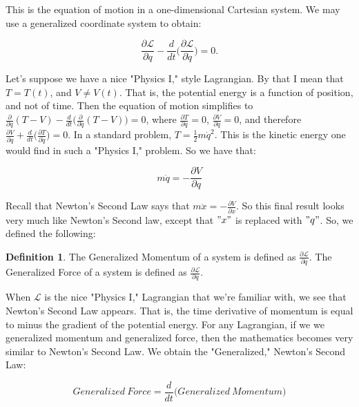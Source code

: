 \documentclass[oneside]{book}
\theoremstyle{definition}
\newtheorem{definition}{Definition}[section]
\begin{document}
This is the equation of motion in a one-dimensional Cartesian system. We may use a generalized coordinate system to obtain:

\begin{equation}
\nonumber \frac{\partial \mathcal{L}}{\partial q} - \frac{d}{dt} \big(\frac{\partial \mathcal{L}}{\partial \dot{q}}\big) = 0.
\end{equation}

Let's suppose we have a nice "Physics I," style Lagrangian. By that I mean that $T = T(t)$, and $V \ne V(t)$. That is, the potential energy is a function of position, and not of time. Then the equation of motion simplifies to $\frac{\partial}{\partial q}(T-V) - \frac{d}{dt}\big(\frac{\partial}{\partial \dot{q}}(T-V)\big) = 0$, where $\frac{\partial T}{\partial q} = 0$, $\frac{\partial V}{\partial \dot{q}} = 0$, and therefore $\frac{\partial V}{\partial q} + \frac{d}{dt}\big(\frac{\partial T}{\partial \dot{q}}\big) = 0$. In a standard problem, $T = \frac{1}{2}m \dot{q}^2$. This is the kinetic energy one would find in such a "Physics I," problem. So we have that:

\begin{equation}
\nonumber m\ddot{q} = -\frac{\partial V}{\partial q}
\end{equation}

Recall that Newton's Second Law says that $m\ddot{x} = -\frac{\partial V}{\partial x}$. So this final result looks very much like Newton's Second law, except that $"x"$ is replaced with $"q"$. So, we defined the following:

\begin{definition}
The Generalized Momentum of a system is defined as $\frac{\partial \mathcal{L}}{\partial \dot{q}}$. The Generalized Force of a system is defined as $\frac{\partial \mathcal{L}}{\partial q}$.
\end{definition}

When $\mathcal{L}$ is the nice "Physics I," Lagrangian that we're familiar with, we see that Newton's Second Law appears. That is, the time derivative of momentum is equal to minus the gradient of the potential energy. For any Lagrangian, if we we generalized momentum and generalized force, then the mathematics becomes very similar to Newton's Second Law. We obtain the "Generalized," Newton's Second Law:

\begin{equation}
\nonumber Generalized\ Force = \frac{d}{dt}\big(Generalized\ Momentum\big)
\end{equation}
\end{document}
